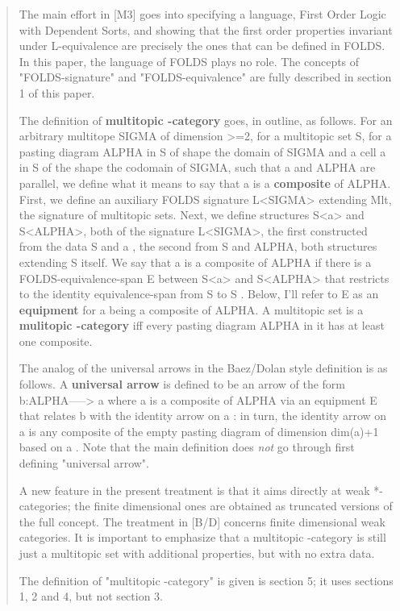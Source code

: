 \begin{quote}
The main effort in [M3] goes into specifying a language, First Order Logic
with Dependent Sorts, and showing that the first order properties
invariant under L-equivalence are precisely the ones that can be defined
in FOLDS. In this paper, the language of FOLDS plays no role. The concepts
of "FOLDS-signature" and "FOLDS-equivalence" are fully described in
section 1 of this paper. 

The definition of \textbf{multitopic \omega -category} goes, in outline, as
follows. For an arbitrary multitope SIGMA of dimension >=2, for a
multitopic set S, for a pasting diagram ALPHA in S of shape the domain of
SIGMA and a cell a in S of the shape the codomain of SIGMA, such that a
and ALPHA are parallel, we define what it means to say that a is a
\textbf{composite} of ALPHA. First, we define an auxiliary FOLDS signature
L<SIGMA> extending Mlt, the signature of multitopic sets. Next, we define
structures S<a> and S<ALPHA>, both of the signature L<SIGMA>, the first
constructed from the data S and a , the second from S and ALPHA, both
structures extending S itself. We say that a is a composite of ALPHA if
there is a FOLDS-equivalence-span E between S<a> and S<ALPHA> that
restricts to the identity equivalence-span from S to S . Below, I'll refer
to  E as an \textbf{equipment} for  a  being a composite of ALPHA. A multitopic
set is a \textbf{mulitopic \omega -category} iff every pasting diagram  ALPHA in it
has at least one composite.

The analog of the universal arrows in the Baez/Dolan style definition is
as follows. A \textbf{universal arrow} is defined to be an arrow of the form
b:ALPHA-----> a where  a  is a composite of ALPHA via an equipment E that
relates b with the identity arrow on  a : in turn, the identity arrow on
a  is any composite of the empty pasting diagram of dimension  dim(a)+1
based on  a . Note that the main definition does \emph{not} go through first
defining "universal arrow". 

A new feature in the present treatment is that it aims directly at weak
*\omega *-categories; the finite dimensional ones are obtained as truncated
versions of the full concept. The treatment in [B/D] concerns finite
dimensional weak categories. It is important to emphasize that a
multitopic \omega -category is still just a multitopic set with additional
properties, but with no extra data.

The definition of "multitopic \omega -category" is given is section 5; it
uses sections 1, 2 and 4, but not section 3.


\end{quote}
